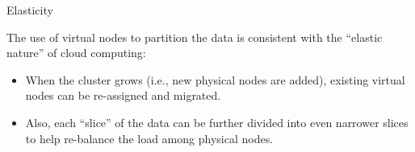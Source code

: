 
%
%

\begin{frame}{Elasticity}

The use of virtual nodes to partition the data is consistent with the ``elastic nature'' of cloud computing:
\begin{itemize}[-]
\item When the cluster grows (i.e., new physical nodes are added), existing virtual nodes can be re-assigned and migrated.
\item Also, each ``slice'' of the data can be further divided into even narrower slices to help re-balance the load among physical nodes.
\end{itemize}
\end{frame}

